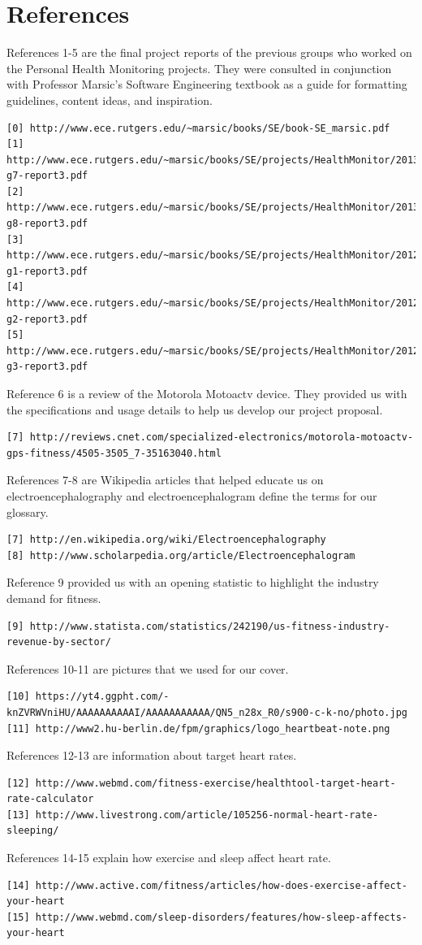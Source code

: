 \documentclass[letterpaper,english, 12pt]{scrreprt}
\begin{document}
\chapter*{References}

References 1-5 are the final project reports of the previous groups who worked on the Personal Health Monitoring projects. They were consulted in conjunction with Professor Marsic's Software Engineering textbook as a guide for formatting guidelines, content ideas, and inspiration. 
\begin{verbatim}
[0] http://www.ece.rutgers.edu/~marsic/books/SE/book-SE_marsic.pdf
[1] http://www.ece.rutgers.edu/~marsic/books/SE/projects/HealthMonitor/2013-g7-report3.pdf
[2] http://www.ece.rutgers.edu/~marsic/books/SE/projects/HealthMonitor/2013-g8-report3.pdf
[3] http://www.ece.rutgers.edu/~marsic/books/SE/projects/HealthMonitor/2012-g1-report3.pdf
[4] http://www.ece.rutgers.edu/~marsic/books/SE/projects/HealthMonitor/2012-g2-report3.pdf
[5] http://www.ece.rutgers.edu/~marsic/books/SE/projects/HealthMonitor/2012-g3-report3.pdf
\end{verbatim}
Reference 6 is a review of the Motorola Motoactv device. They provided us with the specifications and usage details to help us develop our project proposal.
\begin{verbatim}
[7] http://reviews.cnet.com/specialized-electronics/motorola-motoactv-gps-fitness/4505-3505_7-35163040.html
\end{verbatim}

References 7-8 are Wikipedia articles that helped educate us on electroencephalography and electroencephalogram define the terms for our glossary.
\begin{verbatim}
[7] http://en.wikipedia.org/wiki/Electroencephalography
[8] http://www.scholarpedia.org/article/Electroencephalogram
\end{verbatim}

Reference 9 provided us with an opening statistic to highlight the industry demand for fitness.
\begin{verbatim}
[9] http://www.statista.com/statistics/242190/us-fitness-industry-revenue-by-sector/
\end{verbatim}

References 10-11 are pictures that we used for our cover.
\begin{verbatim}
[10] https://yt4.ggpht.com/-knZVRWVniHU/AAAAAAAAAAI/AAAAAAAAAAA/QN5_n28x_R0/s900-c-k-no/photo.jpg
[11] http://www2.hu-berlin.de/fpm/graphics/logo_heartbeat-note.png
\end{verbatim}


References 12-13 are information about target heart rates.
\begin{verbatim}
[12] http://www.webmd.com/fitness-exercise/healthtool-target-heart-rate-calculator
[13] http://www.livestrong.com/article/105256-normal-heart-rate-sleeping/
\end{verbatim}

References 14-15 explain how exercise and sleep affect heart rate.
\begin{verbatim}
[14] http://www.active.com/fitness/articles/how-does-exercise-affect-your-heart
[15] http://www.webmd.com/sleep-disorders/features/how-sleep-affects-your-heart
\end{verbatim}
\end{document}
